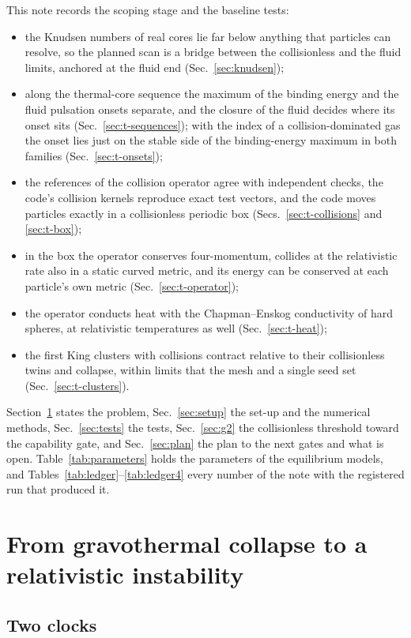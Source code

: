 \documentclass[aps,prd,twocolumn,10pt,superscriptaddress,nofootinbib,longbibliography,floatfix]{revtex4-2}
\begin{document}
This note records the scoping stage and the baseline tests:
\begin{itemize}
\item the Knudsen numbers of real cores lie far below anything that particles can resolve, so the planned scan is a bridge between the collisionless and the fluid limits, anchored at the fluid end (Sec.~\ref{sec:knudsen});
\item along the thermal-core sequence the maximum of the binding energy and the fluid pulsation onsets separate, and the closure of the fluid decides where its onset sits (Sec.~\ref{sec:t-sequences}); with the index of a collision-dominated gas the onset lies just on the stable side of the binding-energy maximum in both families (Sec.~\ref{sec:t-onsets});
\item the references of the collision operator agree with independent checks, the code's collision kernels reproduce exact test vectors, and the code moves particles exactly in a collisionless periodic box (Secs.~\ref{sec:t-collisions} and \ref{sec:t-box});
\item in the box the operator conserves four-momentum, collides at the relativistic rate also in a static curved metric, and its energy can be conserved at each particle's own metric (Sec.~\ref{sec:t-operator});
\item the operator conducts heat with the Chapman--Enskog conductivity of hard spheres, at relativistic temperatures as well (Sec.~\ref{sec:t-heat});
\item the first King clusters with collisions contract relative to their collisionless twins and collapse, within limits that the mesh and a single seed set (Sec.~\ref{sec:t-clusters}).
\end{itemize}
Section~\ref{sec:problem} states the problem, Sec.~\ref{sec:setup} the set-up and the numerical methods, Sec.~\ref{sec:tests} the tests, Sec.~\ref{sec:g2} the collisionless threshold toward the capability gate, and Sec.~\ref{sec:plan} the plan to the next gates and what is open. Table~\ref{tab:parameters} holds the parameters of the equilibrium models, and Tables~\ref{tab:ledger}--\ref{tab:ledger4} every number of the note with the registered run that produced it.

\section{From gravothermal collapse to a relativistic instability}\label{sec:problem}

\subsection{Two clocks}\label{sec:clocks}
\end{document}
